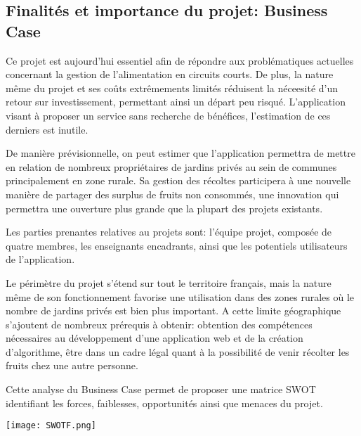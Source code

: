 \documentclass{article}
\begin{document}
\subsection{Finalités et importance du projet: Business Case}

Ce projet est aujourd'hui essentiel afin de répondre aux problématiques actuelles concernant la gestion de l'alimentation en circuits courts. De plus, la nature même du projet et ses coûts extrêmements limités réduisent la néceesité d'un retour sur investissement, permettant ainsi un départ peu risqué. L'application visant à proposer un service sans recherche de bénéfices, l'estimation de ces derniers est inutile.

De manière prévisionnelle, on peut estimer que l'application permettra de mettre en relation de nombreux propriétaires de jardins privés au sein de communes principalement en zone rurale. Sa gestion des récoltes participera à une nouvelle manière de partager des surplus de fruits non consommés, une innovation qui permettra une ouverture plus grande que la plupart des projets existants.

\vspace{4mm}

Les parties prenantes relatives au projets sont: l'équipe projet, composée de quatre membres, les enseignants encadrants, ainsi que les potentiels utilisateurs de l'application.

Le périmètre du projet s'étend sur tout le territoire français, mais la nature même de son fonctionnement favorise une utilisation dans des zones rurales où le nombre de jardins privés est bien plus important.
A cette limite géographique s'ajoutent de nombreux prérequis à obtenir: obtention des compétences nécessaires au développement d'une application web et de la création d'algorithme, être dans un cadre légal quant à la possibilité de venir récolter les fruits chez une autre personne.

\vspace{4mm}
 
Cette analyse du Business Case permet de proposer une matrice SWOT identifiant les forces, faiblesses, opportunités ainsi que menaces du projet.

\vspace{2mm}             
  
\begin{centering}
\texttt{[image: SWOTF.png]}
\end{centering}
\end{document}
